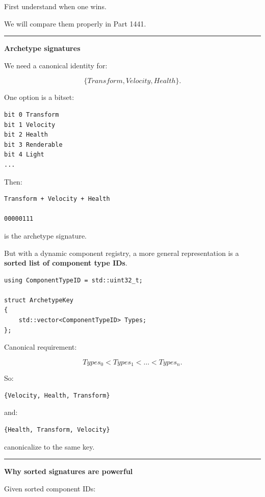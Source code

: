 First understand when one wins.

We will compare them properly in Part 1441.

\begin{center}\rule{0.5\linewidth}{0.5pt}\end{center}

\textbf{Archetype signatures}

We need a canonical identity for:

\[
\{Transform,Velocity,Health\}.
\]

One option is a bitset:

\begin{verbatim}
bit 0 Transform
bit 1 Velocity
bit 2 Health
bit 3 Renderable
bit 4 Light
...
\end{verbatim}

Then:

\begin{verbatim}
Transform + Velocity + Health

00000111
\end{verbatim}

is the archetype signature.

But with a dynamic component registry, a more general representation is a \textbf{sorted list of component type IDs}.

\begin{verbatim}
using ComponentTypeID = std::uint32_t;

struct ArchetypeKey
{
    std::vector<ComponentTypeID> Types;
};
\end{verbatim}

Canonical requirement:

\[
Types_0<Types_1<\dots<Types_n.
\]

So:

\begin{verbatim}
{Velocity, Health, Transform}
\end{verbatim}

and:

\begin{verbatim}
{Health, Transform, Velocity}
\end{verbatim}

canonicalize to the same key.

\begin{center}\rule{0.5\linewidth}{0.5pt}\end{center}

\textbf{Why sorted signatures are powerful}

Given sorted component IDs:

